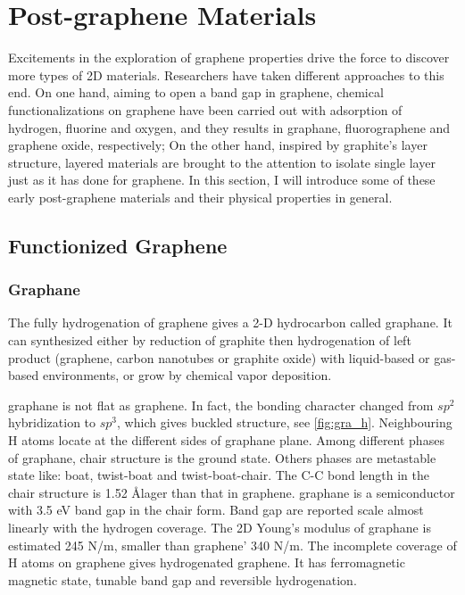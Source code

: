 \section{Post-graphene Materials}

Excitements in the exploration of graphene properties drive the force to discover more types of 2D materials. Researchers have taken different approaches to this end. On one hand, aiming to open a band gap in graphene, chemical functionalizations on graphene have been carried out with adsorption of hydrogen, fluorine and oxygen, and they results in graphane, fluorographene and graphene oxide, respectively; On the other hand, inspired by graphite's layer structure, layered materials are brought to the attention to isolate single layer just as it has done for graphene. In this section, I will introduce some of these early post-graphene materials and their physical properties in general.

\subsection{Functionized Graphene}

\subsubsection{Graphane}

The fully hydrogenation of graphene gives a 2-D hydrocarbon called graphane. It can synthesized either by reduction of graphite then hydrogenation of left product (graphene, carbon nanotubes or graphite oxide) with liquid-based\cite{Yang2012} or gas-based\cite{Burgess2011} environments, or grow by chemical vapor deposition\cite{wang2010}. 


graphane is not flat as graphene. In fact, the bonding character changed from $sp^2$ hybridization to $sp^3$, which gives buckled structure, see \autoref{fig:gra_h}. Neighbouring H atoms locate at the different sides of graphane plane. Among different phases of graphane, chair structure is the ground state. Others phases are metastable state like: boat, twist-boat and twist-boat-chair\cite{Samarakoon2009}. The C-C bond length in the chair structure is 1.52 \AA lager than that in graphene. graphane is a semiconductor with 3.5 eV band gap in the chair form. Band gap are reported scale almost linearly with the hydrogen coverage\cite{Ilyin2011}. The 2D Young's modulus of graphane is estimated 245 \si{N/m}\cite{Munoz2010}, smaller than graphene' 340 \si{N/m}. The incomplete coverage of H atoms on graphene gives hydrogenated graphene. It has ferromagnetic magnetic state\cite{Zhou2009}, tunable band gap\cite{Shkrebtii2011} and reversible hydrogenation\cite{Elias2009}. 

